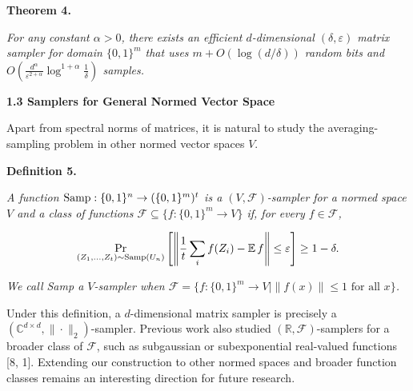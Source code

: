 \documentclass[10pt,a4paper]{article}
\begin{document}


\par\medskip\noindent\textbf{
\textbf{Theorem 4}\textbf{.}
}\par



\emph{For any constant $\alpha>0$, there exists an efficient $d$-dimensional $(\delta,\varepsilon)$ matrix sampler for domain $\{0,1\}^{m}$ that uses $m+O(\log(d/\delta))$ random bits and $O(\frac{d^{\alpha}}{\varepsilon^{2+\alpha}}\log^{1+\alpha}\frac{1}{\delta})$ samples.}\par







\par\medskip\noindent\textbf{
1.3 Samplers for General Normed Vector Space}\par




Apart from spectral norms of matrices, it is natural to study the averaging-sampling problem in other normed vector spaces $V$.\par





\par\medskip\noindent\textbf{
\textbf{Definition 5}\textbf{.}
}\par



\emph{A function $\textup{{Samp}}:\{0,1\}^{n}\to(\{0,1\}^{m})^{t}$ is a $(V,\mathcal{F})$-sampler for a normed space $V$ and a class of functions $\mathcal{F}\subseteq\{f:\{0,1\}^{m}\to V\}$ if, for every $f\in\mathcal{F}$,}\par


\[\begin{gathered}
\Pr_{(Z_{1},\dots,Z_{t})\sim\textup{{Samp}}(U_{n})}\left[\left\lVert\frac{1}{t}\sum_{i}f(Z_{i})-\operatorname*{\mathbb{E}}f\right\rVert\leq\varepsilon\right]\geq 1-\delta.
\end{gathered}\]


\emph{We call Samp a $V$-sampler when $\mathcal{F}=\{f:\{0,1\}^{m}\to V\mid\|f(x)\|\leq 1\text{ for all }x\}$.}\par






Under this definition, a $d$-dimensional matrix sampler is precisely a $(\mathbb{C}^{d\times d},\|\cdot\|_{2})$-sampler. Previous work also studied $(\mathbb{R},\mathcal{F})$-samplers for a broader class of $\mathcal{F}$, such as subgaussian or subexponential real-valued functions [8, 1]. Extending our construction to other normed spaces and broader function classes remains an interesting direction for future research.\par
\end{document}
